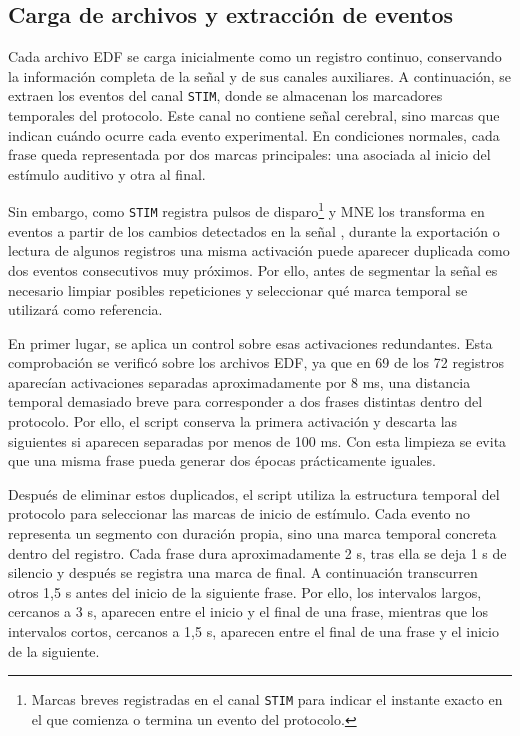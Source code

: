 \subsection{Carga de archivos y extracción de eventos}

Cada archivo \ac{EDF} se carga inicialmente como un registro continuo, conservando la información completa de la señal y de sus canales auxiliares. A continuación, se extraen los eventos del canal \texttt{STIM}, donde se almacenan los marcadores temporales del protocolo. Este canal no contiene señal cerebral, sino marcas que indican cuándo ocurre cada evento experimental. En condiciones normales, cada frase queda representada por dos marcas principales: una asociada al inicio del estímulo auditivo y otra al final. 

Sin embargo, como \texttt{STIM} registra pulsos de disparo\footnote{Marcas breves registradas en el canal \texttt{STIM} para indicar el instante exacto en el que comienza o termina un evento del protocolo.} y MNE los transforma en eventos a partir de los cambios detectados en la señal \cite{mneEventsFromRaw}, durante la exportación o lectura de algunos registros una misma activación puede aparecer duplicada como dos eventos consecutivos muy próximos. Por ello, antes de segmentar la señal es necesario limpiar posibles repeticiones y seleccionar qué marca temporal se utilizará como referencia.

En primer lugar, se aplica un control sobre esas activaciones redundantes. Esta comprobación se verificó sobre los archivos \ac{EDF}, ya que en 69 de los 72 registros aparecían activaciones separadas aproximadamente por 8 ms, una distancia temporal demasiado breve para corresponder a dos frases distintas dentro del protocolo. Por ello, el script conserva la primera activación y descarta las siguientes si aparecen separadas por menos de 100 ms. Con esta limpieza se evita que una misma frase pueda generar dos épocas prácticamente iguales.

Después de eliminar estos duplicados, el script utiliza la estructura temporal del protocolo para seleccionar las marcas de inicio de estímulo. Cada evento no representa un segmento con duración propia, sino una marca temporal concreta dentro del registro. Cada frase dura aproximadamente 2 s, tras ella se deja 1 s de silencio y después se registra una marca de final. A continuación transcurren otros 1,5 s antes del inicio de la siguiente frase. Por ello, los intervalos largos, cercanos a 3 s, aparecen entre el inicio y el final de una frase, mientras que los intervalos cortos, cercanos a 1,5 s, aparecen entre el final de una frase y el inicio de la siguiente.

